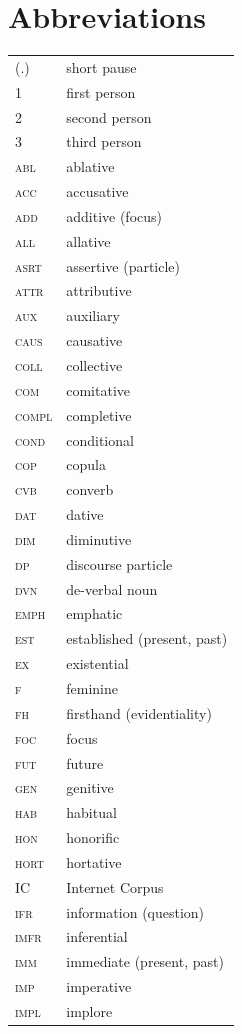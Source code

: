 \documentclass[output=paper,colorlinks,citecolor=brown,chinesefont]{langscibook}
\begin{document}
\section*{Abbreviations}
\largerpage[2]
\begin{tabularx}{.5\textwidth}{lQ}%
(.) & short pause \\
\scshape 1 & first person \\
\scshape 2 & second person\\
\scshape 3 & third person\\
\scshape abl & ablative\\
\scshape acc & accusative\\
\scshape add & additive (focus)\\ 
\scshape all & allative\\
\scshape asrt & assertive (particle) \\
\scshape attr & attributive\\ 
\scshape aux & auxiliary\\
\scshape caus & causative\\
\scshape coll & collective\\
\scshape com & comitative\\
\scshape compl & completive\\
\scshape cond & conditional\\
\scshape cop & copula\\
\scshape cvb & converb\\
\scshape dat & dative\\
\scshape dim & diminutive\\
\scshape dp & discourse particle\\
\scshape dvn & de-verbal noun\\
\scshape emph & emphatic\\
\scshape est & established (present, past) \\
\scshape ex & existential \\
\scshape f & feminine \\
\scshape fh & firsthand (evidentiality) \\
\scshape foc & focus\\
\scshape fut & future \\
\scshape gen & genitive\\
\scshape hab & habitual\\
\scshape hon & honorific \\
\scshape hort & hortative\\
\scshape IC & Internet Corpus\\
\scshape ifr & information (question) \\
\scshape imfr & inferential \\
\scshape imm & immediate (present, past) \\
\scshape imp & imperative\\
\scshape impl & implore\\
\end{tabularx}
\end{document}
